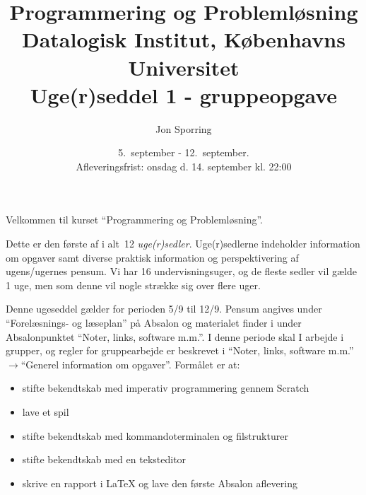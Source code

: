 \documentclass[a4paper,12pt]{article}
\title{Programmering og Problemløsning\\Datalogisk Institut,
  Københavns Universitet\\Uge(r)seddel 1 - gruppeopgave}
\author{Jon Sporring}
\date{5.\ september - 12.\ september.\\Afleveringsfrist: onsdag d. 14. september kl. 22:00}
\begin{document}
\maketitle

Velkommen til kurset ``Programmering og Problemløsning''.

Dette er den første af i alt~12 \emph{uge(r)sedler}. Uge(r)sedlerne indeholder information om opgaver samt diverse praktisk information og perspektivering af ugens/ugernes pensum. Vi har 16 undervisningsuger, og de fleste sedler vil gælde 1 uge, men som denne vil nogle strække sig over flere uger.

Denne ugeseddel gælder for perioden 5/9 til 12/9. Pensum angives under "`Forelæsnings- og læseplan"' på Absalon og materialet finder i under Absalonpunktet "`Noter, links, software m.m."'.  I denne periode skal I arbejde i grupper, og regler for gruppearbejde er beskrevet i "`Noter, links, software m.m."'$\rightarrow$"`Generel information om opgaver"'. Formålet er at:
\begin{itemize}
\item stifte bekendtskab med imperativ programmering gennem Scratch
\item lave et spil
\item stifte bekendtskab med kommandoterminalen og filstrukturer
\item stifte bekendtskab med en teksteditor
\item skrive en rapport i LaTeX og lave den første Absalon aflevering
\end{itemize}
\end{document}
